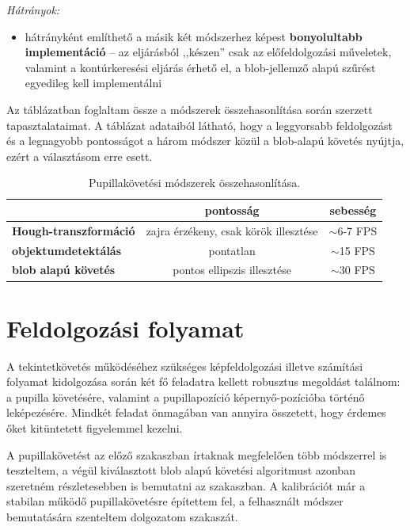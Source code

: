 \emph{Hátrányok:}

\begin{itemize}
  \item hátrányként említhető a másik két módszerhez képest \textbf{bonyolultabb implementáció} -- az eljárásból ,,készen'' csak az előfeldolgozási műveletek, valamint a kontúrkeresési eljárás érhető el, a blob-jellemző alapú szűrést egyedileg kell implementálni
\end{itemize}

\medskip

Az  táblázatban foglaltam össze a módszerek összehasonlítása során szerzett tapasztalataimat. A táblázat adataiból látható, hogy a leggyorsabb feldolgozást és a legnagyobb pontosságot a három módszer közül a blob-alapú követés nyújtja, ezért a választásom erre esett.

\begin{table}[ht]
	\centering
	\caption{Pupillakövetési módszerek összehasonlítása.} \label{tab:modsz}
	\begin{tabular}{ l | c | c }
	 & pontosság & sebesség \\ \hline \hline
	\textbf{Hough-transzformáció} & zajra érzékeny, csak körök illesztése & $\sim$6-7 FPS \\
	\textbf{objektumdetektálás} & pontatlan & $\sim$15 FPS  \\
	\textbf{blob alapú követés} & pontos ellipszis illesztése & $\sim$30 FPS \\
	\end{tabular}
\end{table}

\section{Feldolgozási folyamat}\label{sect:feld_folyamat}

A tekintetkövetés működéséhez szükséges képfeldolgozási illetve számítási folyamat kidolgozása során két fő feladatra kellett robusztus megoldást találnom: a pupilla követésére, valamint a pupillapozíció képernyő-pozícióba történő leképezésére. Mindkét feladat önmagában van annyira összetett, hogy érdemes őket kitüntetett figyelemmel kezelni.

A pupillakövetést az előző szakaszban írtaknak megfelelően több módszerrel is teszteltem, a végül kiválasztott blob alapú követési algoritmust azonban szeretném részletesebben is bemutatni az  szakaszban. A kalibrációt már a stabilan működő pupillakövetésre építettem fel, a felhasznált módszer bemutatására szenteltem dolgozatom  szakaszát.

